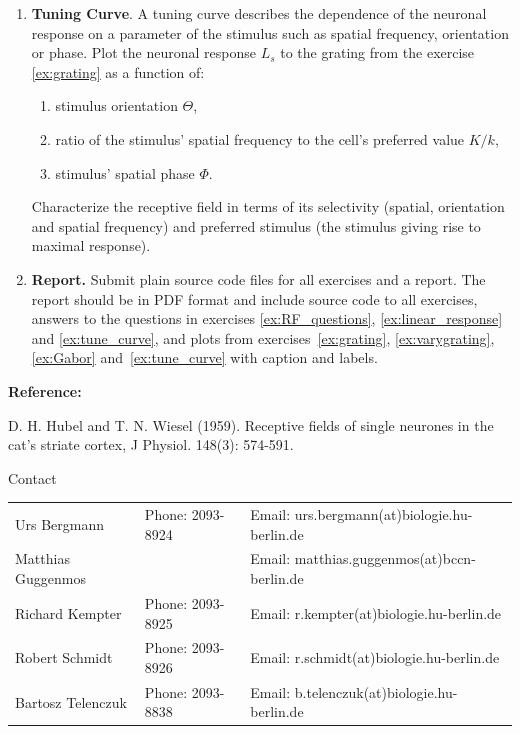 \documentclass[12pt, a4]{article}
\begin{document}
\begin{enumerate}
\begin{enumerate}
        \end{enumerate}

    \item\label{ex:tune_curve} \textbf{Tuning Curve}. A tuning curve describes the dependence of
        the neuronal response on a parameter of the stimulus such as
        spatial frequency, orientation or phase. Plot the neuronal
        response $L_s$ to the grating from the exercise \ref{ex:grating} as a 
        function of:

        \begin{enumerate}
            \item\label{ex:tuneorient} stimulus orientation $\Theta$,
            \item ratio of the stimulus' spatial frequency to the
                cell's preferred value $K/k$,
            \item\label{ex:tunephase} stimulus' spatial phase  $\Phi$.

        \end{enumerate}
        Characterize the receptive field in terms of its selectivity
        (spatial, orientation and spatial frequency) and preferred stimulus
        (the stimulus giving rise to maximal response). 
    \item {\bf Report.} Submit plain source code files for all exercises and a
    report. The report should be in PDF format and include source
    code to all exercises, answers to the
    questions in exercises \ref{ex:RF_questions}, \ref{ex:linear_response}
    and \ref{ex:tune_curve}, and plots from exercises~\ref{ex:grating},
    \ref{ex:varygrating}, \ref{ex:Gabor} and~\ref{ex:tune_curve} with
    caption and labels. 

\end{enumerate}

{\bf Reference:}

D. H. Hubel and T. N. Wiesel (1959). Receptive fields of single
neurones in the cat's striate cortex, J Physiol. 148(3): 574-591. 

\vfill
\centerline{\CAP Contact}
\CAP

\begin{tabular}{lll}
Urs Bergmann & Phone: 2093-8924 & Email:
urs.bergmann(at)biologie.hu-berlin.de \\
Matthias Guggenmos & & Email: matthias.guggenmos(at)bccn-berlin.de \\
Richard Kempter \hfill & Phone: 2093-8925 \hfill & Email:
r.kempter(at)biologie.hu-berlin.de \\
Robert Schmidt & Phone: 2093-8926 & Email: r.schmidt(at)biologie.hu-berlin.de
\\
Bartosz Telenczuk & Phone: 2093-8838 & Email:
b.telenczuk(at)biologie.hu-berlin.de \\
\end{tabular}
\end{document}
